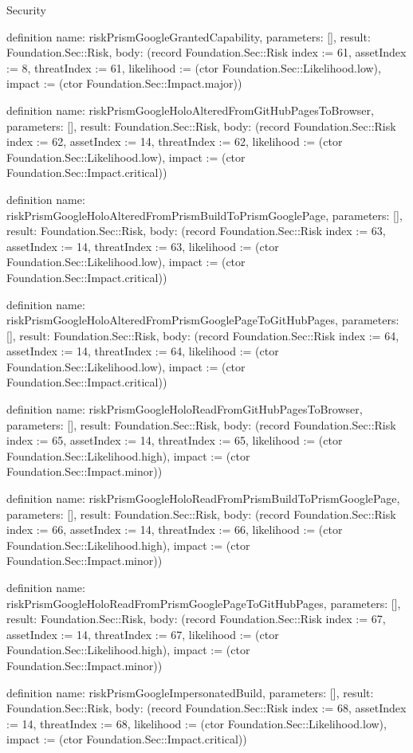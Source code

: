 \begin{lexlean}{Security}
\begin{semanticmodule}
definition{
  name: riskPrismGoogleGrantedCapability,
  parameters: [],
  result: Foundation.Sec::Risk,
  body: (record Foundation.Sec::Risk {index := 61, assetIndex := 8, threatIndex := 61, likelihood := (ctor Foundation.Sec::Likelihood.low), impact := (ctor Foundation.Sec::Impact.major)})
}

definition{
  name: riskPrismGoogleHoloAlteredFromGitHubPagesToBrowser,
  parameters: [],
  result: Foundation.Sec::Risk,
  body: (record Foundation.Sec::Risk {index := 62, assetIndex := 14, threatIndex := 62, likelihood := (ctor Foundation.Sec::Likelihood.low), impact := (ctor Foundation.Sec::Impact.critical)})
}

definition{
  name: riskPrismGoogleHoloAlteredFromPrismBuildToPrismGooglePage,
  parameters: [],
  result: Foundation.Sec::Risk,
  body: (record Foundation.Sec::Risk {index := 63, assetIndex := 14, threatIndex := 63, likelihood := (ctor Foundation.Sec::Likelihood.low), impact := (ctor Foundation.Sec::Impact.critical)})
}

definition{
  name: riskPrismGoogleHoloAlteredFromPrismGooglePageToGitHubPages,
  parameters: [],
  result: Foundation.Sec::Risk,
  body: (record Foundation.Sec::Risk {index := 64, assetIndex := 14, threatIndex := 64, likelihood := (ctor Foundation.Sec::Likelihood.low), impact := (ctor Foundation.Sec::Impact.critical)})
}

definition{
  name: riskPrismGoogleHoloReadFromGitHubPagesToBrowser,
  parameters: [],
  result: Foundation.Sec::Risk,
  body: (record Foundation.Sec::Risk {index := 65, assetIndex := 14, threatIndex := 65, likelihood := (ctor Foundation.Sec::Likelihood.high), impact := (ctor Foundation.Sec::Impact.minor)})
}

definition{
  name: riskPrismGoogleHoloReadFromPrismBuildToPrismGooglePage,
  parameters: [],
  result: Foundation.Sec::Risk,
  body: (record Foundation.Sec::Risk {index := 66, assetIndex := 14, threatIndex := 66, likelihood := (ctor Foundation.Sec::Likelihood.high), impact := (ctor Foundation.Sec::Impact.minor)})
}

definition{
  name: riskPrismGoogleHoloReadFromPrismGooglePageToGitHubPages,
  parameters: [],
  result: Foundation.Sec::Risk,
  body: (record Foundation.Sec::Risk {index := 67, assetIndex := 14, threatIndex := 67, likelihood := (ctor Foundation.Sec::Likelihood.high), impact := (ctor Foundation.Sec::Impact.minor)})
}

definition{
  name: riskPrismGoogleImpersonatedBuild,
  parameters: [],
  result: Foundation.Sec::Risk,
  body: (record Foundation.Sec::Risk {index := 68, assetIndex := 14, threatIndex := 68, likelihood := (ctor Foundation.Sec::Likelihood.low), impact := (ctor Foundation.Sec::Impact.critical)})
}


\end{semanticmodule}
\end{lexlean}
